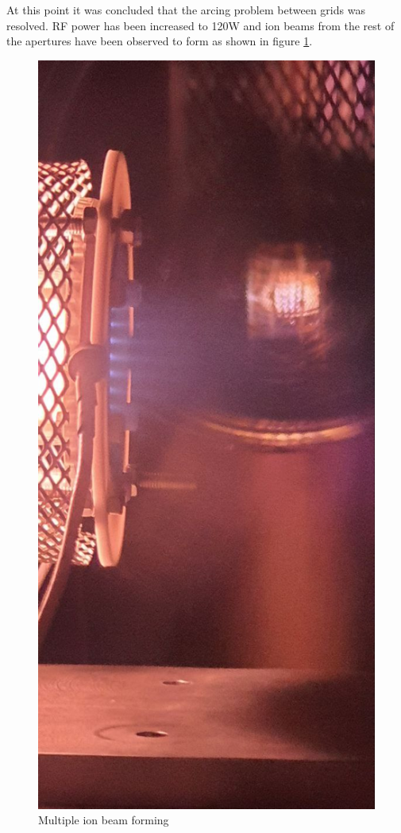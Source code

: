 At this point it was concluded that the arcing problem between grids was resolved. RF power has been increased to 120W and ion beams from the rest of the apertures have been observed to form as shown in figure \ref{fig:4th_multi}. 

\begin{figure}[ht]
    \centering
    \includegraphics[scale=0.4]{fig/deneme4/test4_multibeam.jpeg}
    \caption{Multiple ion beam forming}
    \label{fig:4th_multi}
\end{figure}

